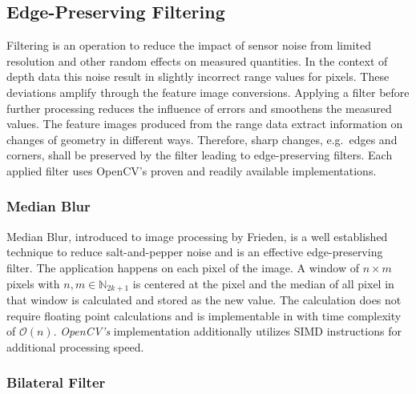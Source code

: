 \subsection{Edge-Preserving Filtering}

Filtering is an operation to reduce the impact of sensor noise from limited resolution and other random effects on measured quantities.
In the context of depth data this noise result in slightly incorrect range values for pixels.
These deviations amplify through the feature image conversions.
Applying a filter before further processing reduces the influence of errors and smoothens the measured values.
The feature images produced from the range data extract information on changes of geometry in different ways.
Therefore, sharp changes, e.g.~edges and corners, shall be preserved by the filter leading to edge-preserving filters.
Each applied filter uses OpenCV's\cite{opencv_library} proven and readily available implementations.

\subsubsection{Median Blur}

Median Blur, introduced to image processing by Frieden\cite{frieden_new76}, is a well established technique to reduce salt-and-pepper noise and is an effective edge-preserving filter.
The application happens on each pixel of the image.
A window of $n \times m$ pixels with $n,m \in \mathbb{N}_{2k + 1}$ is centered at the pixel and the median of all pixel in that window is calculated and stored as the new value.
The calculation does not require floating point calculations and is implementable in with time complexity of $\mathcal{O}(n)$\cite{huang_ieee79}.
\emph{OpenCV's} implementation additionally utilizes \acrshort{SIMD} instructions for additional processing speed.

\subsubsection{Bilateral Filter}

